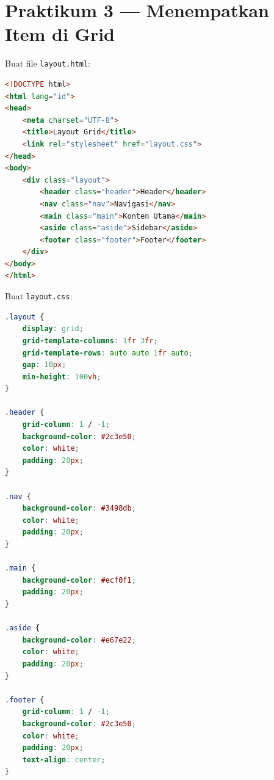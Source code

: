 \section{Praktikum 3 --- Menempatkan Item di Grid}
\label{sec:grid-praktik-3}

\begin{langkah}
  \item Buat file \texttt{layout.html}:
\end{langkah}

\begin{lstlisting}[language=HTML, caption={Struktur layout.html}, label={lst:layout-html}]
<!DOCTYPE html>
<html lang="id">
<head>
    <meta charset="UTF-8">
    <title>Layout Grid</title>
    <link rel="stylesheet" href="layout.css">
</head>
<body>
    <div class="layout">
        <header class="header">Header</header>
        <nav class="nav">Navigasi</nav>
        <main class="main">Konten Utama</main>
        <aside class="aside">Sidebar</aside>
        <footer class="footer">Footer</footer>
    </div>
</body>
</html>
\end{lstlisting}

\begin{langkah}
  \item Buat \texttt{layout.css}:
\end{langkah}

\begin{lstlisting}[language=CSS, caption={Layout halaman dengan grid}, label={lst:layout-css}]
.layout {
    display: grid;
    grid-template-columns: 1fr 3fr;
    grid-template-rows: auto auto 1fr auto;
    gap: 10px;
    min-height: 100vh;
}

.header {
    grid-column: 1 / -1;
    background-color: #2c3e50;
    color: white;
    padding: 20px;
}

.nav {
    background-color: #3498db;
    color: white;
    padding: 20px;
}

.main {
    background-color: #ecf0f1;
    padding: 20px;
}

.aside {
    background-color: #e67e22;
    color: white;
    padding: 20px;
}

.footer {
    grid-column: 1 / -1;
    background-color: #2c3e50;
    color: white;
    padding: 20px;
    text-align: center;
}
\end{lstlisting}

